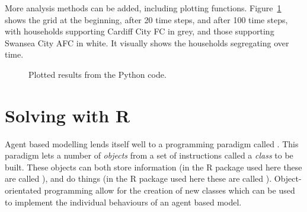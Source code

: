 More analysis methods can be added, including plotting functions.
Figure~\ref{fig:schelling_python_plot} shows the grid at the beginning, after 20
time steps, and after 100 time steps, with households supporting Cardiff City FC
in grey, and those supporting Swansea City AFC in white.
It visually shows the households segregating over time.

\begin{figure}
\begin{center}
\end{center}
\caption{Plotted results from the Python code.}
\label{fig:schelling_python_plot}
\end{figure}

\section{Solving with R}\label{sec:agent_based_simulation_solving-with-R}

Agent based modelling lends itself well to a programming paradigm called
.
This paradigm lets a number of \textit{objects} from a set of instructions
called a \textit{class} to be built.
These objects can both store information (in the R package used here these are called
\textit{}), and do things (in the R package used here these are called
\textit{}).
Object-orientated programming allow for the creation of new classes which can be
used to implement the individual behaviours of an agent based model.

